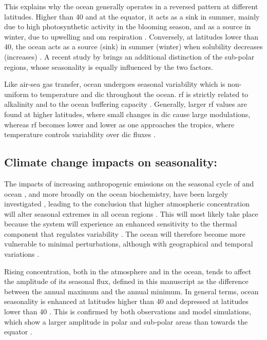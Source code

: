 This explains why the ocean generally operates in a reversed pattern at different latitudes. Higher than 40\textdegree{} and at the equator, it acts as a  sink in summer, mainly due to high photosynthetic activity in the blooming season, and as a source in winter, due to upwelling and \ac{om} respiration \citep{gallego2018drivers, takahashi2002global}. Conversely, at latitudes lower than 40\textdegree{}, the ocean acts as a  source (sink) in summer (winter) when solubility decreases (increases) \citep{yun2022enhance}. A recent study by \cite{lerner2021drivers} brings an additional distinction of the sub-polar regions, whose  seasonality is equally influenced by the two factors.

Like air-sea gas transfer, ocean  undergoes seasonal variability which is non-uniform to temperature and \ac{dic} throughout the ocean. \ac{rf} is strictly related to alkalinity and to the ocean buffering capacity \citep{egleston2010revelle}. Generally, larger \ac{rf} values are found at higher latitudes, where small changes in \ac{dic} cause large  modulations, whereas \ac{rf} becomes lower and lower as one approaches the tropics, where temperature controls  variability over \ac{dic} fluxes \citep{fassbender2018seasonal}. 

\subsection{Climate change impacts on  seasonality:}

The impacts of increasing anthropogenic emissions on the seasonal cycle of  and ocean , and more broadly on the ocean biochemistry, have been largely investigated \citep{lerner2021drivers, landschutzer2018strengthening, kwiatkowski2018diverging}, leading to the conclusion that higher atmospheric  concentration will alter seasonal extremes in all ocean regions \citep{landschutzer2018strengthening}. This will most likely take place because the system will experience an enhanced sensitivity to the thermal component that regulates  variability \citep{mcneil2019changing}. The ocean will therefore become more vulnerable to minimal perturbations, although with geographical and temporal variations \citep{landschutzer2018strengthening, egleston2010revelle}.

Rising  concentration, both in the atmosphere and in the ocean, tends to affect the amplitude of its seasonal flux, defined in this manuscript as the difference between the annual maximum and the annual minimum. In general terms, ocean  seasonality is enhanced at latitudes higher than 40\textdegree{} and depressed at latitudes lower than 40\textdegree{} \citep{yun2022enhance}. This is confirmed by both observations and model simulations, which show a larger  amplitude in polar and sub-polar areas than towards the equator \citep{schwinger2022report, gallego2018drivers}. 

